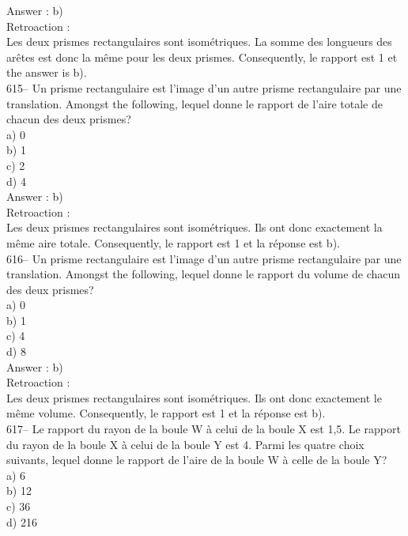 ﻿\documentclass[letterpaper, 12pt]{article}
\begin{document}
Answer : b)\\

Retroaction : \\
Les deux prismes rectangulaires sont isom\'etriques.  La somme des longueurs
des ar\^etes est donc la m\^eme pour les deux prismes.  Consequently, le
rapport est 1 et the answer is b).\\

615-- Un prisme rectangulaire est l'image d'un autre prisme rectangulaire
par une translation.  Amongst the following, lequel donne le
rapport de l'aire totale de chacun des deux prismes?\\
a) 0\\
b) 1\\
c) 2\\
d) 4\\

Answer : b)\\

Retroaction : \\
Les deux prismes rectangulaires sont isom\'etriques.  Ils ont donc
exactement la m\^eme aire totale.  Consequently, le rapport est 1 et la
r\'eponse est b).\\

616-- Un prisme rectangulaire est l'image d'un autre prisme rectangulaire
par une translation.  Amongst the following, lequel donne le
rapport du volume de chacun des deux prismes?\\
a) 0\\
b) 1\\
c) 4\\
d) 8\\

Answer : b)\\

Retroaction : \\
Les deux prismes rectangulaires sont isom\'etriques.  Ils ont donc
exactement le m\^eme volume.  Consequently, le rapport est 1 et la
r\'eponse est b).\\

617-- Le rapport du rayon de la boule W \`a celui de la boule X est 1,5.  Le
rapport du rayon de la boule X \`a celui de la boule Y est 4.  Parmi les
quatre choix suivants, lequel donne le rapport de l'aire de la boule W \`a
celle de la boule Y?\\
a) 6\\
b) 12\\
c) 36\\
d) 216\\
\end{document}
